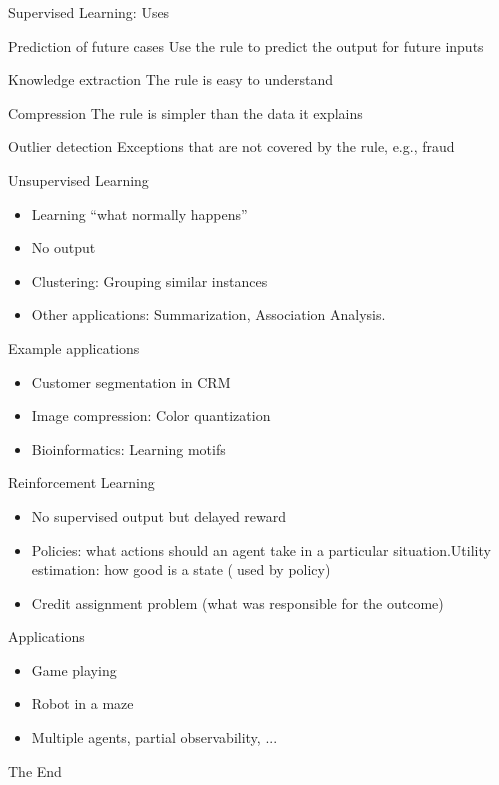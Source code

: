\documentclass{beamer}
\begin{document}
\begin{frame}{Supervised Learning: Uses}
   \begin{block}{Prediction of future cases}
   Use the rule to predict the output for future inputs
   \end{block}
   \begin{block}{Knowledge extraction}
 The rule is easy to understand
   \end{block}
   \begin{block}{Compression}
  The rule is simpler than the data it explains
   \end{block}
   \begin{block}{Outlier detection}
   Exceptions that are not covered by the rule, e.g., fraud
   \end{block}
  
\end{frame}

\begin{frame}{Unsupervised Learning}
    \begin{itemize}
        \item Learning “what normally happens”
\item No output
\item Clustering: Grouping similar instances
\item Other applications: Summarization, Association Analysis. \end{itemize}
\begin{block}{Example applications}
\begin{itemize}
    \item Customer segmentation in CRM
\item Image compression: Color quantization
\item Bioinformatics: Learning motifs
\end{itemize}
\end{block}
\end{frame}

\begin{frame}{Reinforcement Learning}
    \begin{itemize}
        \item No supervised output but delayed reward
        \item Policies: what actions should an agent take in a particular situation.Utility estimation: how good is a state (used by policy)
        \item Credit assignment problem (what was responsible for the outcome) 
     \end{itemize}
     \begin{block}{Applications}
     \begin{itemize}
        \item Game playing
        \item Robot in a maze
        \item Multiple agents, partial observability, ...
     \end{itemize}
     \end{block}
   \end{frame}

\begin{frame}
\huge{\centerline{The End}}
\end{frame}
\end{document}
